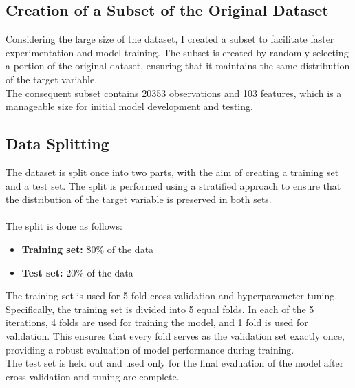 \subsection{Creation of a Subset of the Original Dataset}
Considering the large size of the dataset, I created a subset to facilitate faster experimentation and model training. The subset is created by randomly selecting a portion of the original dataset, ensuring that it maintains the same distribution of the target variable.\\
The consequent subset contains 20353 observations and 103 features, which is a manageable size for initial model development and testing. 

\subsection{Data Splitting}
The dataset is split once into two parts, with the aim of creating a training set and a test set. The split is performed using a stratified approach to ensure that the distribution of the target variable is preserved in both sets.\\\\
The split is done as follows:
\begin{itemize}
    \item \textbf{Training set:} 80\% of the data
    \item \textbf{Test set:} 20\% of the data
\end{itemize}
\noindent
The training set is used for 5-fold cross-validation and hyperparameter tuning. Specifically, the training set is divided into 5 equal folds. In each of the 5 iterations, 4 folds are used for training the model, and 1 fold is used for validation. This ensures that every fold serves as the validation set exactly once, providing a robust evaluation of model performance during training.\\
The test set is held out and used only for the final evaluation of the model after cross-validation and tuning are complete.


